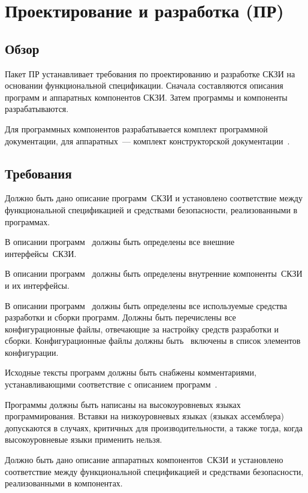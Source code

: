 \section{Проектирование и разработка (ПР)}\label{DI}

\subsection{Обзор}\label{DI.Intro}

Пакет ПР устанавливает требования по проектированию и разработке СКЗИ
на основании функциональной спецификации.
%
Сначала составляются описания программ и аппаратных компонентов СКЗИ.
Затем программы и компоненты разрабатываются.

Для программных компонентов разрабатывается комплект программной 
документации, для аппаратных~--- комплект конструкторской 
документации~.

\subsection{Требования}\label{DI.Reqs}

\label{R.DI.ProgSpec}
Должно быть дано описание программ~СКЗИ и установлено соответствие 
между функциональной спецификацией и средствами безопасности,
реализованными в программах.


\label{R.DI.HLD}
В описании программ~
должны быть определены все внешние интерфейсы~СКЗИ.

\label{R.DI.LLD}
В описании программ~
должны быть определены внутренние компоненты~СКЗИ и их интерфейсы.

\label{R.DI.Tools}
В описании программ~
должны быть определены все используемые средства разработки
и сборки программ. Должны быть перечислены все конфигурационные файлы,
отвечающие за настройку средств разработки и сборки. 
Конфигурационные файлы должны быть~ включены в список 
элементов конфигурации.

\label{R.DI.Comments}
Исходные тексты программ должны быть снабжены комментариями,
устанавливающими соответствие с описанием программ~.

\label{R.DI.Language}
Программы должны быть написаны на высокоуровневых языках программирования.
Вставки на низкоуровневых языках (языках ассемблера)
допускаются в случаях, критичных для производительности, 
а также тогда, когда высокоуровневые языки применить нельзя.

\label{R.DI.HardSpec}
Должно быть дано описание аппаратных компонентов~СКЗИ и установлено соответствие 
между функциональной спецификацией и средствами безопасности,
реализованными в компонентах.

